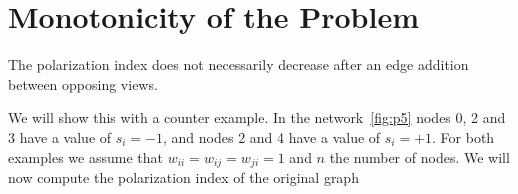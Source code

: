 \section{Monotonicity of the Problem}
\label{sec:monotonicity}

\begin{lemma}
The polarization index does not necessarily decrease after an edge addition between opposing views.
\end{lemma}

\vspace{20pt}
\noindent We will  show this with a counter example. In the network~\ref{fig:p5} nodes 0, 2 and 3 have a value of $s_i=-1$, and nodes 2 and 4 have a value of $s_i=+1$. For both examples we assume that $w_{ii}=w_{ij}=w_{ji}=1$ and $n$ the number of nodes. We will now compute the polarization index of the original graph
\\
